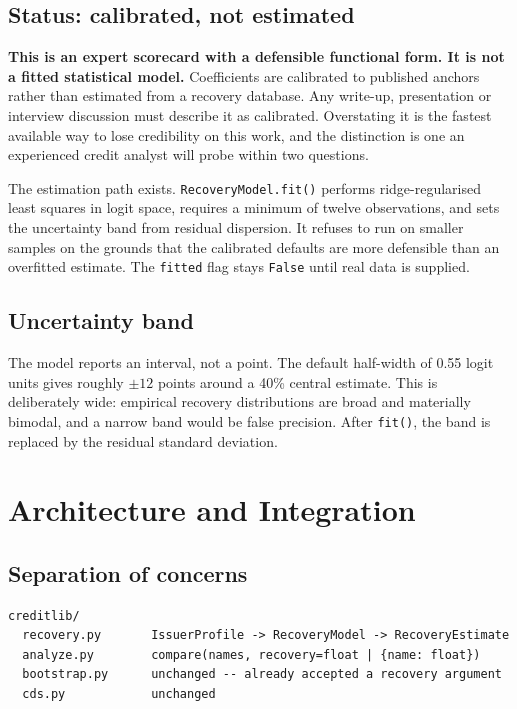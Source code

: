 \documentclass[11pt,a4paper]{article}
\newcommand{\keypoint}[1]{\par\vspace{0.4em}\noindent
  \colorbox{codebg}{\parbox{\dimexpr\linewidth-2\fboxsep}{\small #1}}\par\vspace{0.5em}}
\begin{document}
\subsection{Status: calibrated, not estimated}

\keypoint{\textbf{This is an expert scorecard with a defensible functional form. It is
not a fitted statistical model.} Coefficients are calibrated to published anchors
rather than estimated from a recovery database. Any write-up, presentation or interview
discussion must describe it as calibrated. Overstating it is the fastest available way
to lose credibility on this work, and the distinction is one an experienced credit
analyst will probe within two questions.}

The estimation path exists. \texttt{RecoveryModel.fit()} performs ridge-regularised
least squares in logit space, requires a minimum of twelve observations, and sets the
uncertainty band from residual dispersion. It refuses to run on smaller samples on the
grounds that the calibrated defaults are more defensible than an overfitted estimate.
The \texttt{fitted} flag stays \texttt{False} until real data is supplied.

\subsection{Uncertainty band}

The model reports an interval, not a point. The default half-width of 0.55 logit units
gives roughly $\pm 12$ points around a 40\% central estimate. This is deliberately wide:
empirical recovery distributions are broad and materially bimodal, and a narrow band
would be false precision. After \texttt{fit()}, the band is replaced by the residual
standard deviation.

\section{Architecture and Integration}

\subsection{Separation of concerns}

\begin{lstlisting}[language={}]
creditlib/
  recovery.py       IssuerProfile -> RecoveryModel -> RecoveryEstimate
  analyze.py        compare(names, recovery=float | {name: float})
  bootstrap.py      unchanged -- already accepted a recovery argument
  cds.py            unchanged
\end{lstlisting}
\end{document}
